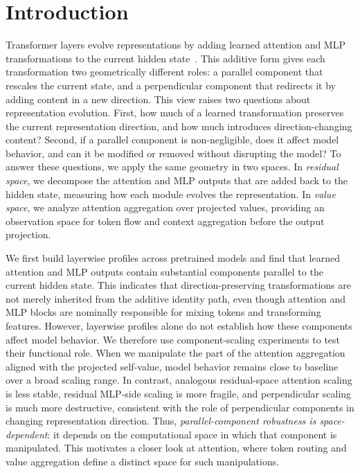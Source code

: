 \section{Introduction}
\label{sec:intro}

Transformer layers evolve representations by adding learned attention and MLP
transformations to the current hidden state~\citep{vaswani2017attention,elhage2021mathematical}.
This additive form gives each transformation two geometrically different
roles: a parallel component that rescales the current state, and a
perpendicular component that redirects it by adding content in a new direction.
This view raises two questions about representation evolution. First, how much
of a learned transformation preserves the current representation direction,
and how much introduces direction-changing content? Second, if a parallel
component is non-negligible, does it affect model behavior, and can it be
modified or removed without disrupting the model? To answer these questions,
we apply the same geometry in two spaces. In \emph{residual space}, we
decompose the attention and MLP outputs that are added back to the hidden
state, measuring how each module evolves the representation. In \emph{value
space}, we analyze attention aggregation over projected values, providing an
observation space for token flow and context aggregation before the output
projection.

We first build layerwise profiles across pretrained models and find that
learned attention and MLP outputs contain substantial components parallel to
the current hidden state. This indicates that direction-preserving
transformations are not merely inherited from the additive identity path, even
though attention and MLP blocks are nominally responsible for mixing tokens
and transforming features.
However, layerwise profiles alone do not establish how these components affect
model behavior. We therefore use component-scaling experiments to test their
functional role. When we manipulate the part of the attention aggregation aligned
with the projected self-value, model behavior remains close to baseline over a
broad scaling range. In contrast, analogous residual-space attention scaling
is less stable, residual MLP-side scaling is more fragile, and perpendicular
scaling is much more destructive, consistent with the role of perpendicular
components in changing representation direction. Thus, \textit{parallel-component
robustness is space-dependent}: it depends on the computational space in
which that component is manipulated. This motivates a closer look at attention,
where token routing and value aggregation define a distinct space for such
manipulations.

